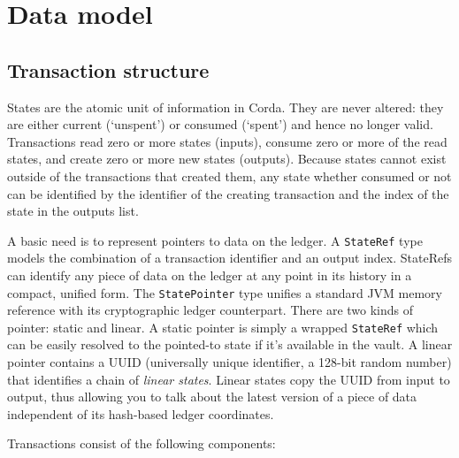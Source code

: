\documentclass{article}
\begin{document}
\section{Data model}

\subsection{Transaction structure}\label{subsec:transaction-structure}

States are the atomic unit of information in Corda. They are never altered: they are either current (`unspent') or
consumed (`spent') and hence no longer valid.  Transactions read zero or more states (inputs), consume zero or more
of the read states, and create zero or more new states (outputs). Because states cannot exist outside of the
transactions that created them, any state whether consumed or not can be identified by the identifier of the
creating transaction and the index of the state in the outputs list.

A basic need is to represent pointers to data on the ledger. A \texttt{StateRef} type models the combination of a
transaction identifier and an output index. StateRefs can identify any piece of data on the ledger at any point in
its history in a compact, unified form. The \texttt{StatePointer} type unifies a standard JVM memory reference with
its cryptographic ledger counterpart. There are two kinds of pointer: static and linear. A static pointer is simply
a wrapped \texttt{StateRef} which can be easily resolved to the pointed-to state if it's available in the vault. A
linear pointer contains a UUID (universally unique identifier, a 128-bit random number) that identifies a chain of
\emph{linear states}. Linear states copy the UUID from input to output, thus allowing you to talk about the latest
version of a piece of data independent of its hash-based ledger coordinates.

Transactions consist of the following components:
\end{document}
